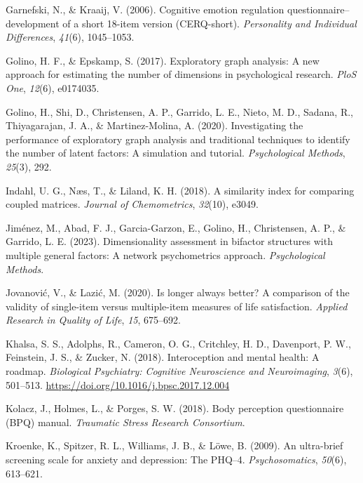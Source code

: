 \documentclass[
  jou,
  floatsintext,
  longtable,
  nolmodern,
  notxfonts,
  notimes,
  colorlinks=true,linkcolor=blue,citecolor=blue,urlcolor=blue]{apa7}
\newlength{\cslhangindent}
\newenvironment{CSLReferences}[2] %
 {\begin{list}{}{%
  \setlength{\itemindent}{0pt}
  \setlength{\leftmargin}{0pt}
  \setlength{\parsep}{0pt}
  \ifodd #1
   \setlength{\leftmargin}{\cslhangindent}
   \setlength{\itemindent}{-1\cslhangindent}
  \fi
  \setlength{\itemsep}{#2\baselineskip}}}
 {\end{list}}
\begin{document}
\begin{CSLReferences}{1}{0}
Garnefski, N., \& Kraaij, V. (2006). Cognitive emotion regulation
questionnaire--development of a short 18-item version (CERQ-short).
\emph{Personality and Individual Differences}, \emph{41}(6), 1045--1053.

Golino, H. F., \& Epskamp, S. (2017). Exploratory graph analysis: A new
approach for estimating the number of dimensions in psychological
research. \emph{PloS One}, \emph{12}(6), e0174035.

Golino, H., Shi, D., Christensen, A. P., Garrido, L. E., Nieto, M. D.,
Sadana, R., Thiyagarajan, J. A., \& Martinez-Molina, A. (2020).
Investigating the performance of exploratory graph analysis and
traditional techniques to identify the number of latent factors: A
simulation and tutorial. \emph{Psychological Methods}, \emph{25}(3),
292.

Indahl, U. G., Næs, T., \& Liland, K. H. (2018). A similarity index for
comparing coupled matrices. \emph{Journal of Chemometrics},
\emph{32}(10), e3049.

Jiménez, M., Abad, F. J., Garcia-Garzon, E., Golino, H., Christensen, A.
P., \& Garrido, L. E. (2023). Dimensionality assessment in bifactor
structures with multiple general factors: A network psychometrics
approach. \emph{Psychological Methods}.

Jovanović, V., \& Lazić, M. (2020). Is longer always better? A
comparison of the validity of single-item versus multiple-item measures
of life satisfaction. \emph{Applied Research in Quality of Life},
\emph{15}, 675--692.

Khalsa, S. S., Adolphs, R., Cameron, O. G., Critchley, H. D., Davenport,
P. W., Feinstein, J. S., \& Zucker, N. (2018). Interoception and mental
health: A roadmap. \emph{Biological Psychiatry: Cognitive Neuroscience
and Neuroimaging}, \emph{3}(6), 501--513.
\url{https://doi.org/10.1016/j.bpsc.2017.12.004}

Kolacz, J., Holmes, L., \& Porges, S. W. (2018). Body perception
questionnaire (BPQ) manual. \emph{Traumatic Stress Research Consortium}.

Kroenke, K., Spitzer, R. L., Williams, J. B., \& Löwe, B. (2009). An
ultra-brief screening scale for anxiety and depression: The PHQ--4.
\emph{Psychosomatics}, \emph{50}(6), 613--621.


\end{CSLReferences}
\end{document}
